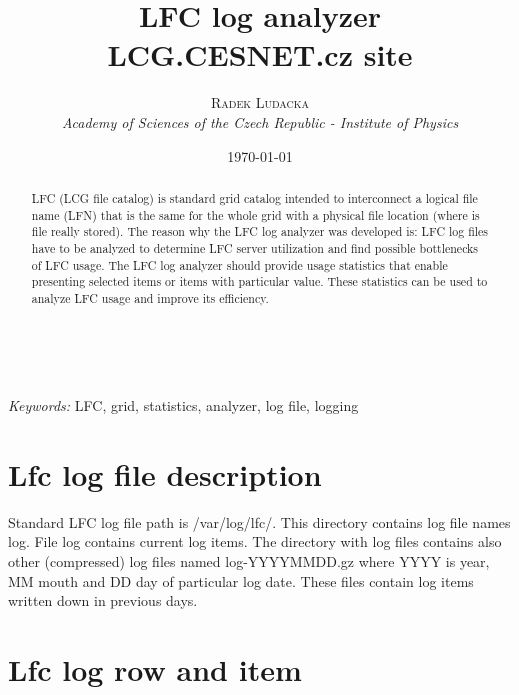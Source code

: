 \documentclass[a4paper, 11pt]{article} %
\title{\textbf{LFC log analyzer}\\ %
LCG.CESNET.cz site} %
\author{\textsc{Radek Ludacka} %
\\{\textit{Academy of Sciences of the Czech Republic - Institute of Physics}}} %
\date{\today} %
\makeatletter
\renewcommand{\maketitle}{ %
\begin{flushright} %
{\LARGE\@title} %

\vspace{50pt} %

{\large\@author} %
\\\@date %

\vspace{40pt} %
\end{flushright}
}
\makeatother
\begin{document}
\maketitle %



\begin{abstract}
LFC (LCG file catalog) is standard grid catalog intended to interconnect a logical file name (LFN) that is the same for the whole grid with a physical file location (where is file really stored). The reason why the LFC log analyzer was developed is: LFC log files have to be analyzed to determine LFC server utilization and find possible bottlenecks of LFC usage. The LFC log analyzer should provide usage statistics that enable presenting selected items or items with particular value. These statistics can be used to analyze LFC usage and improve its efficiency.
\end{abstract}

\hspace*{3,6mm}\textit{Keywords:} LFC, grid, statistics, analyzer, log file, logging %

\vspace{30pt} %


\section*{Lfc log file description}

Standard LFC log file path is /var/log/lfc/. This directory contains log file names log. File log contains current log items. The directory with log files contains also other (compressed) log files named log-YYYYMMDD.gz where YYYY is year, MM mouth and DD day of particular log date. These files contain log items written down in previous days.

\newpage

\section{Lfc log row and item}
\end{document}
